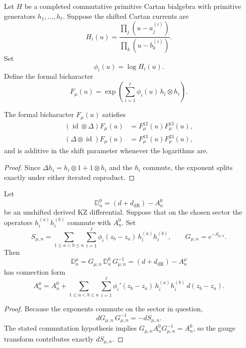 \begin{construction}
Let $H$ be a completed commutative primitive Cartan bialgebra with
primitive generators $h_1,\dots,h_\ell$.  Suppose the shifted Cartan
currents are
\[
H_i(u)=
\frac{\prod_j (u-a_j^{(i)})}{\prod_k (u-b_k^{(i)})}.
\]
Set
\[
\phi_i(u)=\log H_i(u).
\]
Define the formal bicharacter
\[
F_\mu(u)=
\exp\!\left(\sum_{i=1}^{\ell} \phi_i(u)\,h_i\otimes h_i\right).
\]
\end{construction}

\begin{proposition}
\ClaimStatusProvedHere
\label{prop:cartan-shift-cocycle}
The formal bicharacter $F_\mu(u)$ satisfies
\begin{align*}
(\operatorname{id}\otimes \Delta)F_\mu(u)
&=F_\mu^{12}(u)F_\mu^{13}(u),\\
(\Delta\otimes \operatorname{id})F_\mu(u)
&=F_\mu^{13}(u)F_\mu^{23}(u),
\end{align*}
and is additive in the shift parameter whenever the logarithms are.
\end{proposition}

\begin{proof}
Since $\Delta h_i=h_i\otimes 1+1\otimes h_i$ and the $h_i$ commute,
the exponent splits exactly under either iterated coproduct.
\end{proof}

\begin{theorem}
\ClaimStatusProvedHere
\label{thm:cartan-gauge-twist}
Let
\[
\mathbb D_n^0=(d+d_{\mathrm{dR}})-A_n^0
\]
be an unshifted derived KZ differential.  Suppose that on the chosen
sector the operators $h_i^{(a)}h_i^{(b)}$ commute with $A_n^0$.
Set
\[
S_{\mu,n}=
\sum_{1\le a<b\le n}\sum_{i=1}^{\ell}
\phi_i(z_b-z_a)\,h_i^{(a)}h_i^{(b)},
\qquad
G_{\mu,n}=e^{-S_{\mu,n}}.
\]
Then
\[
\mathbb D_n^\mu=G_{\mu,n}\,\mathbb D_n^0\,G_{\mu,n}^{-1}
=(d+d_{\mathrm{dR}})-A_n^\mu
\]
has connection form
\[
A_n^\mu
=
A_n^0
+
\sum_{1\le a<b\le n}\sum_{i=1}^{\ell}
\phi_i'(z_b-z_a)\,h_i^{(a)}h_i^{(b)}\,d(z_b-z_a).
\]
\end{theorem}

\begin{proof}
Because the exponents commute on the sector in question,
\[
dG_{\mu,n}\,G_{\mu,n}^{-1}=-dS_{\mu,n}.
\]
The stated commutation hypothesis implies
$G_{\mu,n}A_n^0G_{\mu,n}^{-1}=A_n^0$, so the gauge transform contributes
exactly $dS_{\mu,n}$.
\end{proof}

